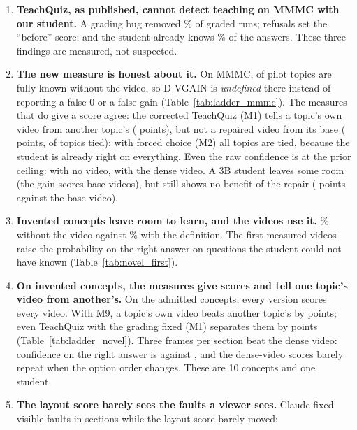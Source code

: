 \documentclass[11pt]{article}
\begin{document}
\begin{enumerate}
  \item \textbf{TeachQuiz, as published, cannot detect teaching on MMMC with our student.} A grading bug removed
  \OrderShare\% of graded runs; refusals set the ``before'' score; and the student already knows
  \mmmcpriorGemmaAcc\% of the answers. These three findings are measured, not suspected.
  \item \textbf{The new measure is honest about it.} On MMMC, \LadMMMCBlindAllRight{} of \LadMMMCTopics{} pilot topics
  are fully known without the video, so D-VGAIN is \emph{undefined} there instead of reporting a false 0 or a false
  gain (Table~\ref{tab:ladder_mmmc}). The measures that do give a score agree: the corrected TeachQuiz (M1) tells a
  topic's own video from another topic's (\LadMMMCSepOne{} points), but not a repaired video from its base
  (\LadMMMCLBOne{} points, \LadMMMCTiesOne{} of \LadMMMCTopics{} topics tied); with forced choice (M2) all
  \LadMMMCTiesTwo{} topics are tied, because the student is already right on everything. Even the raw confidence is at
  the prior ceiling: \LadMMMCSBlind{} with no video, \LadMMMCSVisual{} with the dense video. A 3B student leaves some room
  (the gain scores \LadSmallDefinedNine{} base videos), but still shows no benefit of the repair (\LadSmallLBNine{} points
  against the base video).
  \item \textbf{Invented concepts leave room to learn, and the videos use it.} \novelpriorGemmaAcc\% without the video against
  \novelcardGemmaAcc\% with the definition. The first measured videos raise the probability on the right answer on
  questions the student could not have known (Table~\ref{tab:novel_first}).
  \item \textbf{On invented concepts, the measures give scores and tell one topic's video from another's.} On the \LadNovelTopics{} admitted concepts, every
  version scores every video. With M9, a topic's own video beats another topic's by \LadNovelSepNine{} points; even
  TeachQuiz with the grading fixed (M1) separates them by \LadNovelSepOne{} points (Table~\ref{tab:ladder_novel}). Three
  frames per section beat the dense video: confidence on the right answer is \LadNovelSFrames{} against
  \LadNovelSVisual{}, and the dense-video scores barely repeat when the option order changes. These are 10 concepts and
  one student.
  \item \textbf{The layout score barely sees the faults a viewer sees.}
  Claude fixed \ClaudeFaults{} visible faults in \ClaudeSections{} sections while the layout score barely moved;

\end{enumerate}
\end{document}
